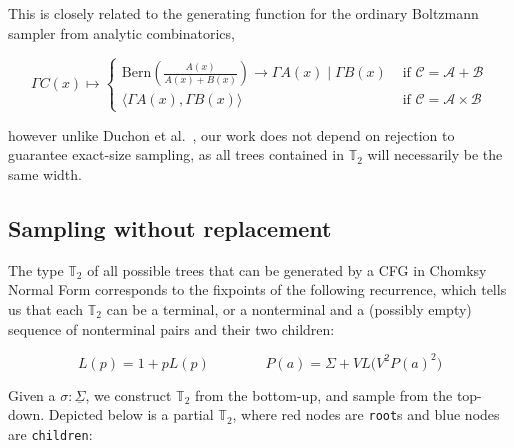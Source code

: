 \documentclass[sigplan,nonacm]{acmart}\settopmatter{printfolios=false,printccs=false,printacmref=false}
\begin{document}
This is closely related to the generating function for the ordinary Boltzmann sampler from analytic combinatorics,

\begin{equation*}
  \Gamma C(x) \mapsto \begin{cases}
  \text{Bern} \left(\frac{A(x)}{A(x) + B(x)}\right) \rightarrow \Gamma A(x) \mid \Gamma B(x) & \text{ if } \mathcal{C}=\mathcal{A}+\mathcal{B} \\
  \big\langle \Gamma A(x), \Gamma B(x)\big\rangle & \text{ if } \mathcal{C}=\mathcal{A} \times \mathcal{B}
  \end{cases}
\end{equation*}

\noindent however unlike Duchon et al.~\cite{duchon2004boltzmann}, our work does not depend on rejection to guarantee exact-size sampling, as all trees contained in $\mathbb{T}_2$ will necessarily be the same width.

\pagebreak\subsection{Sampling without replacement}\label{sec:pairing}

The type $\mathbb{T}_2$ of all possible trees that can be generated by a CFG in Chomksy Normal Form corresponds to the fixpoints of the following recurrence, which tells us that each $\mathbb{T}_2$ can be a terminal, or a nonterminal and a (possibly empty) sequence of nonterminal pairs and their two children:\vspace{-10pt}

\begin{equation*}
  L(p) = 1 + p L(p) \phantom{addspace} P(a) = \Sigma + V L\big(V^2P(a)^2\big)
\end{equation*}

Given a $\sigma: \underline\Sigma$, we construct $\mathbb{T}_2$ from the bottom-up, and sample from the top-down. Depicted below is a partial $\mathbb{T}_2$, where red nodes are \texttt{root}s and blue nodes are \texttt{children}:
\end{document}
